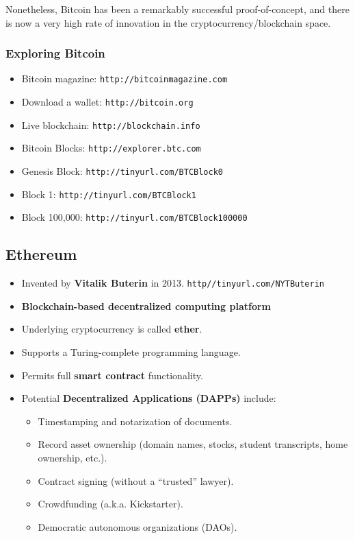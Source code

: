 \documentclass[12pt,titlepage]{article}
\begin{document}
Nonetheless, Bitcoin has been a remarkably successful proof-of-concept, and there is now a very high rate of innovation in the cryptocurrency/blockchain space.

\subsubsection{Exploring Bitcoin}
\begin{itemize}
	\item Bitcoin magazine: \texttt{http://bitcoinmagazine.com}
	\item Download a wallet: \texttt{http://bitcoin.org}
	\item Live blockchain: \texttt{http://blockchain.info}
	\item Bitcoin Blocks: \texttt{http://explorer.btc.com}
	\item Genesis Block: \texttt{http://tinyurl.com/BTCBlock0}
	\item Block 1: \texttt{http://tinyurl.com/BTCBlock1}
	\item Block 100,000: \texttt{http://tinyurl.com/BTCBlock100000}
\end{itemize}
\subsection{Ethereum}
\begin{itemize}
	\item Invented by \textbf{Vitalik Buterin} in 2013. \texttt{http//tinyurl.com/NYTButerin}
	\item \textbf{Blockchain-based decentralized computing platform}
	\item Underlying cryptocurrency is called \textbf{ether}.
	\item Supports a Turing-complete programming language.
	\item Permits full \textbf{smart contract} functionality.
	\item Potential \textbf{Decentralized Applications (DAPPs)} include:\begin{itemize}
		\item Timestamping and notarization of documents.
		\item Record asset ownership (domain names, stocks, student transcripts, home ownership, etc.).
		\item Contract signing (without a ``trusted'' lawyer).
		\item Crowdfunding (a.k.a. Kickstarter).
		\item Democratic autonomous organizations (DAOs).
	\end{itemize}
\end{itemize}
\end{document}
